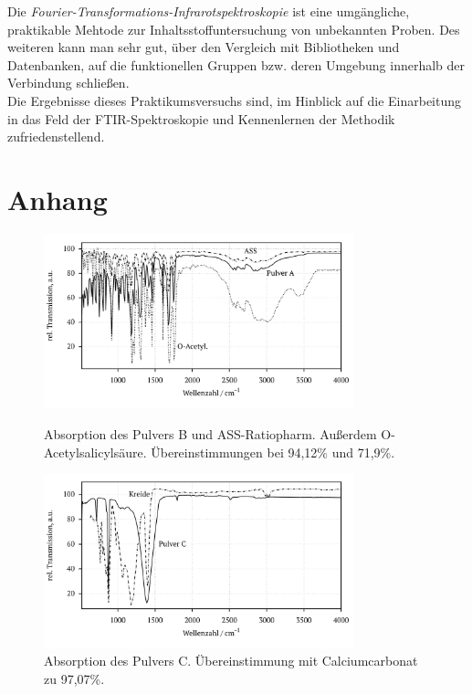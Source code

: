 \documentclass[a4paper,10pt,twocolumn]{article}
\newcommand{\tilt}[1]{\textit{#1}}
\begin{document}
		Die \tilt{Fourier-Transformations-Infrarotspektroskopie} ist eine umg\"angliche, praktikable Mehtode zur Inhaltsstoffuntersuchung von unbekannten Proben. Des weiteren kann man sehr gut, \"uber den Vergleich mit Bibliotheken und Datenbanken, auf die funktionellen Gruppen bzw. deren Umgebung innerhalb der Verbindung schlie{\ss}en.\\
		Die Ergebnisse dieses Praktikumsversuchs sind, im Hinblick auf die Einarbeitung in das Feld der FTIR-Spektroskopie und Kennenlernen der Methodik zufriedenstellend.

	\newpage

	
	

	\onecolumn
	\section{Anhang}

		\begin{figure}[h]
		\centering
			\includegraphics[width=0.8\textwidth]{Gruppe2A/pulver_b.pdf}				\caption{Absorption des Pulvers B und ASS-Ratiopharm. Au{\ss}erdem O-Acetylsalicyls\"aure. \"Ubereinstimmungen bei 94,12\% und 71,9\%.}\label{img:b}
			\includegraphics[width=0.8\textwidth]{Gruppe2A/pulver_c.pdf}				\caption{Absorption des Pulvers C. \"Ubereinstimmung mit Calciumcarbonat zu 97,07\%.}\label{img:c}
		\end{figure}
\end{document}
